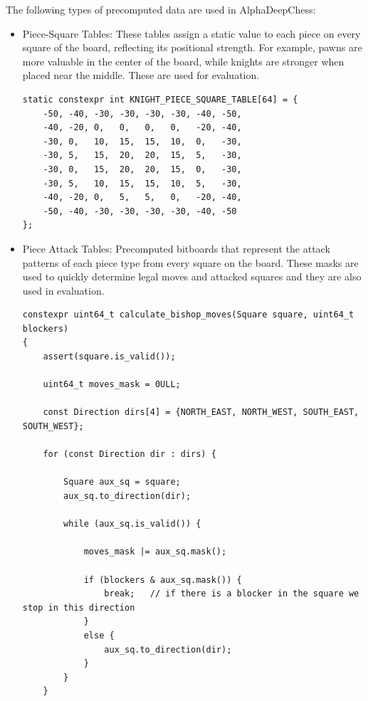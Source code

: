 The following types of precomputed data are used in AlphaDeepChess:

\begin{itemize}
    \item Piece-Square Tables: These tables assign a static value to each piece on every square of the board, reflecting its positional strength. For example, pawns are more valuable in the center of the board, while knights are stronger when placed near the middle. These are used for evaluation.
    
\begin{lstlisting}[breaklines=true, frame=single, caption={Initialization of knight piece-square table}]
static constexpr int KNIGHT_PIECE_SQUARE_TABLE[64] = {
    -50, -40, -30, -30, -30, -30, -40, -50,
    -40, -20, 0,   0,   0,   0,   -20, -40,
    -30, 0,   10,  15,  15,  10,  0,   -30,
    -30, 5,   15,  20,  20,  15,  5,   -30,
    -30, 0,   15,  20,  20,  15,  0,   -30,
    -30, 5,   10,  15,  15,  10,  5,   -30,
    -40, -20, 0,   5,   5,   0,   -20, -40,
    -50, -40, -30, -30, -30, -30, -40, -50
};
\end{lstlisting}
    
    \item Piece Attack Tables: Precomputed bitboards that represent the attack patterns of each piece type from every square on the board. These masks are used to quickly determine legal moves and attacked squares and they are also used in evaluation.
    
\begin{lstlisting}[breaklines=true, frame=single, caption={Initialization of bishop attack tables}]
constexpr uint64_t calculate_bishop_moves(Square square, uint64_t blockers)
{
    assert(square.is_valid());

    uint64_t moves_mask = 0ULL;

    const Direction dirs[4] = {NORTH_EAST, NORTH_WEST, SOUTH_EAST, SOUTH_WEST};

    for (const Direction dir : dirs) {

        Square aux_sq = square;
        aux_sq.to_direction(dir);

        while (aux_sq.is_valid()) {

            moves_mask |= aux_sq.mask();

            if (blockers & aux_sq.mask()) {
                break;   // if there is a blocker in the square we stop in this direction
            }
            else {
                aux_sq.to_direction(dir);
            }
        }
    }


\end{lstlisting}
\end{itemize}
